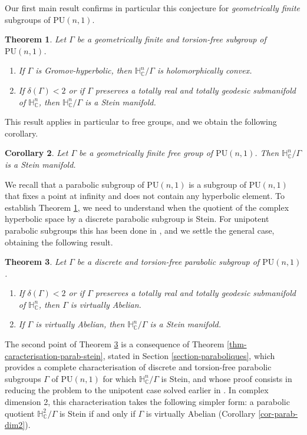 \documentclass{article}
\newtheorem{theoremIntro}{Theorem}
\newtheorem{corollaryIntro}[theoremIntro]{Corollary}
\theoremstyle{definition}
\theoremstyle{remark}
\newcommand{\C}{\mathbb{C}}
\newcommand{\HNC}{\mathbb{H}^{n}_{\C}}
\newcommand{\PU}{\mathrm{PU}}
\begin{document}
	Our first main result confirms in particular this conjecture for \textit{geometrically finite }subgroups of $\PU(n,1)$.
	
	\begin{theoremIntro}\label{thm-geom-fini-delta-stein}
		Let $\Gamma$ be a geometrically finite and torsion-free subgroup of $\PU(n,1)$.\begin{enumerate}[label=(\alph*)]
			\item If $\Gamma$ is Gromov-hyperbolic, then $\HNC/\Gamma$ is holomorphically convex.
			\item If $\delta(\Gamma)<2$ or if $\Gamma$ preserves a totally real and totally geodesic submanifold of $\HNC$, then $\HNC/\Gamma$ is a Stein manifold.
		\end{enumerate}
	\end{theoremIntro}

	This result applies in particular to free groups, and we obtain the following corollary.
	\begin{corollaryIntro}\label{cor-free}
		Let $\Gamma$ be a geometrically finite free group of $\PU(n,1)$. Then $\HNC/\Gamma$ is a Stein manifold.
	\end{corollaryIntro}
	
	We recall that a parabolic subgroup of $\PU(n,1)$ is a subgroup of $\PU(n,1)$ that fixes a point at infinity and does not contain any hyperbolic element. To establish Theorem \ref{thm-geom-fini-delta-stein}, we need to understand when the quotient
	of the complex hyperbolic space by a discrete parabolic subgroup is Stein. For unipotent parabolic subgroups this has been done in \cite{miebachQuotientsBoundedHomogeneous2024}, and we settle the general case, obtaining the following result.
	\begin{theoremIntro}\label{thm-parabolique-abelien-delta-stein}
		Let $\Gamma$ be a discrete and torsion-free parabolic subgroup of $\PU(n,1)$. \begin{enumerate}[label=(\alph*)]
			\item If $\delta(\Gamma)<2$ or if $\Gamma$ preserves a totally real and totally geodesic submanifold of $\HNC$, then $\Gamma$ is virtually Abelian.
			\item If $\Gamma$ is virtually Abelian, then $\HNC/\Gamma$ is a Stein manifold.
		\end{enumerate}
	\end{theoremIntro}
	
	The second point of Theorem \ref{thm-parabolique-abelien-delta-stein} is a consequence of Theorem \ref{thm-caracterisation-parab-stein}, stated in Section \ref{section-paraboliques}, which provides a complete characterisation of discrete and torsion-free parabolic subgroups $\Gamma$ of $\PU(n,1)$ for which $\HNC/\Gamma$ is Stein, and whose proof consists in reducing the problem to the unipotent case solved earlier in \cite{miebachQuotientsBoundedHomogeneous2024}. In complex dimension 2, this characterisation takes the following simpler form: a parabolic quotient $\mathbb{H}^{2}_{\C}/\Gamma$ is Stein if and only if $\Gamma$ is virtually Abelian (Corollary \ref{cor-parab-dim2}).
	
\end{document}
